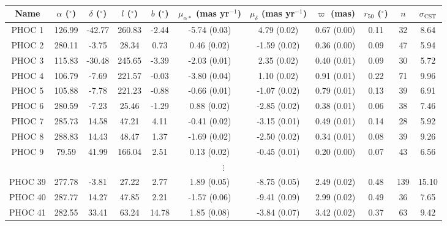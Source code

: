 \begin{table}

\caption{\label{c2:table:new_ocs_short}}

\centering
\begin{tabular}{*{11}{c}}

\hline\hline

Name & $\alpha$ ($^\circ$) & $\delta$ ($^\circ$) & $l$ ($^\circ$) & $b$ ($^\circ$) & $\mu_{\alpha*}$ (mas yr$^{-1}$) & $\mu_{\delta}$ (mas yr$^{-1}$) & $\varpi$ (mas) & $r_{50}$ ($^\circ$) & $n$ & $\sigma_{\text{CST}}$ \\

\hline

PHOC 1 & 126.99 & -42.77 & 260.83 & -2.44 & -5.74 (0.03) & 4.79 (0.02) & 0.67 (0.00) & 0.11 & 32 & 8.64 \\
PHOC 2 & 280.11 & -3.75 & 28.34 & 0.73 & 0.46 (0.02) & -1.59 (0.02) & 0.36 (0.00) & 0.09 & 47 & 5.94 \\
PHOC 3 & 115.83 & -30.48 & 245.65 & -3.39 & -2.03 (0.01) & 2.35 (0.02) & 0.40 (0.01) & 0.09 & 30 & 5.72 \\
PHOC 4 & 106.79 & -7.69 & 221.57 & -0.03 & -3.80 (0.04) & 1.10 (0.02) & 0.91 (0.01) & 0.22 & 71 & 9.96 \\
PHOC 5 & 105.88 & -7.78 & 221.23 & -0.88 & -0.66 (0.01) & -1.07 (0.02) & 0.79 (0.01) & 0.13 & 39 & 6.91 \\
PHOC 6 & 280.59 & -7.23 & 25.46 & -1.29 & 0.88 (0.02) & -2.85 (0.02) & 0.38 (0.01) & 0.06 & 38 & 7.46 \\
PHOC 7 & 285.73 & 14.58 & 47.21 & 4.11 & -0.41 (0.02) & -3.15 (0.01) & 0.49 (0.01) & 0.14 & 28 & 5.92 \\
PHOC 8 & 288.83 & 14.43 & 48.47 & 1.37 & -1.69 (0.02) & -2.50 (0.02) & 0.34 (0.01) & 0.08 & 39 & 9.26 \\
PHOC 9 & 79.59 & 41.99 & 166.04 & 2.51 & 0.13 (0.02) & -0.45 (0.01) & 0.20 (0.00) & 0.07 & 43 & 6.56 \\
\multicolumn{11}{c}{$\vdots$} \\ 
PHOC 39 & 277.78 & -3.81 & 27.22 & 2.77 & 1.89 (0.05) & -8.75 (0.05) & 2.49 (0.02) & 0.48 & 139 & 15.10 \\
PHOC 40 & 287.77 & 14.27 & 47.85 & 2.21 & -1.57 (0.06) & -9.41 (0.09) & 2.99 (0.02) & 0.49 & 36 & 7.65 \\
PHOC 41 & 282.55 & 33.41 & 63.24 & 14.78 & 1.85 (0.08) & -3.84 (0.07) & 3.42 (0.02) & 0.37 & 63 & 9.42 \\

\hline

\end{tabular}


\end{table}


